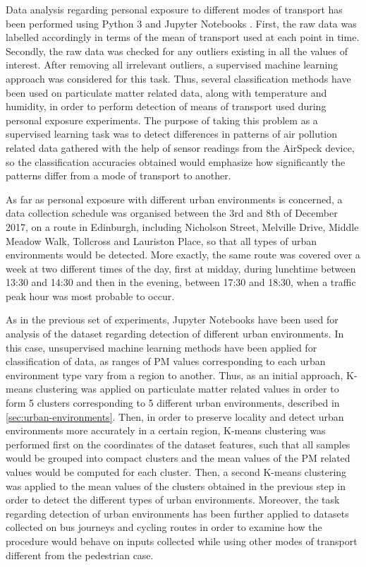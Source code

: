 \documentclass[bsc,frontabs,twoside,singlespacing, parskip,deptreport]{infthesis}     %
\begin{document}
Data analysis regarding personal exposure to different modes of transport has been performed using Python 3 and Jupyter Notebooks \cite{jupyter}. First, the raw data was labelled accordingly in terms of the mean of transport used at each point in time. Secondly, the raw data was checked for any outliers existing in all the values of interest. After removing all irrelevant outliers, a supervised machine learning approach was considered for this task. Thus, several classification methods have been used on particulate matter related data, along with temperature and humidity, in order to perform detection of means of transport used during personal exposure experiments. The purpose of taking this problem as a supervised learning task was to detect differences in patterns of air pollution related data gathered with the help of sensor readings from the AirSpeck device, so the classification accuracies obtained would emphasize how significantly the patterns differ from a mode of transport to another.

As far as personal exposure with different urban environments is concerned, a data collection schedule was organised between the 3rd and 8th of December 2017, on a route in Edinburgh, including Nicholson Street, Melville Drive, Middle Meadow Walk, Tollcross and Lauriston Place, so that all types of urban environments would be detected. More exactly, the same route was covered over a week at two different times of the day, first at midday, during lunchtime between 13:30 and 14:30 and then in the evening, between 17:30 and 18:30, when a traffic peak hour was most probable to occur.

As in the previous set of experiments, Jupyter Notebooks have been used for analysis of the dataset regarding detection of different urban environments. In this case, unsupervised machine learning methods have been applied for classification of data, as ranges of PM values corresponding to each urban environment type vary from a region to another. Thus, as an initial approach, K-means clustering was applied on particulate matter related values in order to form 5 clusters corresponding to 5 different urban environments, described in \ref{sec:urban-environments}. Then, in order to preserve locality and detect urban environments more accurately in a certain region, K-means clustering was performed first on the coordinates of the dataset features, such that all samples would be grouped into compact clusters and the mean values of the PM related values would be computed for each cluster. Then, a second K-means clustering was applied to the mean values of the clusters obtained in the previous step in order to detect the different types of urban environments. Moreover, the task regarding detection of urban environments has been further applied to datasets collected on bus journeys and cycling routes in order to examine how the procedure would behave on inputs collected while using other modes of transport different from the pedestrian case.
\end{document}

